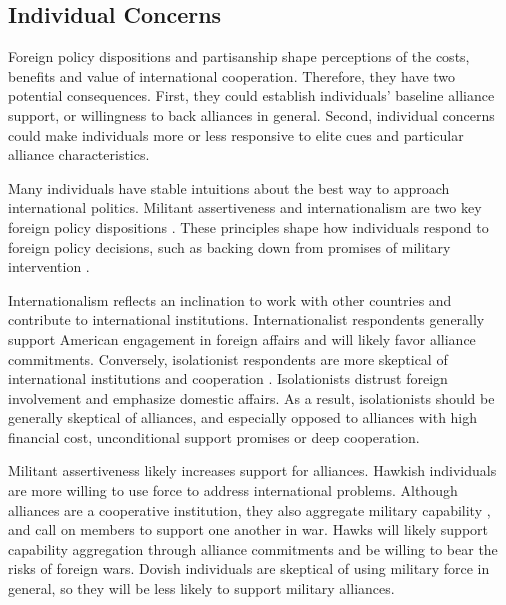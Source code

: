 \documentclass[12pt]{article}
\begin{document}
\subsection{Individual Concerns}


Foreign policy dispositions and partisanship shape perceptions of the costs, benefits and value of international cooperation. 
Therefore, they have two potential consequences. 
First, they could establish individuals' baseline alliance support, or willingness to back alliances in general. 
Second, individual concerns could make individuals more or less responsive to elite cues and particular alliance characteristics. 


Many individuals have stable intuitions about the best way to approach international politics. 
Militant assertiveness and internationalism are two key foreign policy dispositions \citep{Herrmannetal1999}.  
These principles shape how individuals respond to foreign policy decisions, such as backing down from promises of military intervention \citep{KertzerBrutger2016}. 


Internationalism reflects an inclination to work with other countries and contribute to international institutions. 
Internationalist respondents generally support American engagement in foreign affairs and will likely favor alliance commitments. 
Conversely, isolationist respondents are more skeptical of international institutions and cooperation \citep{Kertzer2013}. 
Isolationists distrust foreign involvement and emphasize domestic affairs. 
As a result, isolationists should be generally skeptical of alliances, and especially opposed to alliances with high financial cost, unconditional support promises or deep cooperation. 


Militant assertiveness likely increases support for alliances. 
Hawkish individuals are more willing to use force to address international problems. 
Although alliances are a cooperative institution, they also aggregate military capability \citep{FordhamPoast2014}, and call on members to support one another in war.
Hawks will likely support capability aggregation through alliance commitments and be willing to bear the risks of foreign wars.  
Dovish individuals are skeptical of using military force in general, so they will be less likely to support military alliances. 


\end{document}
